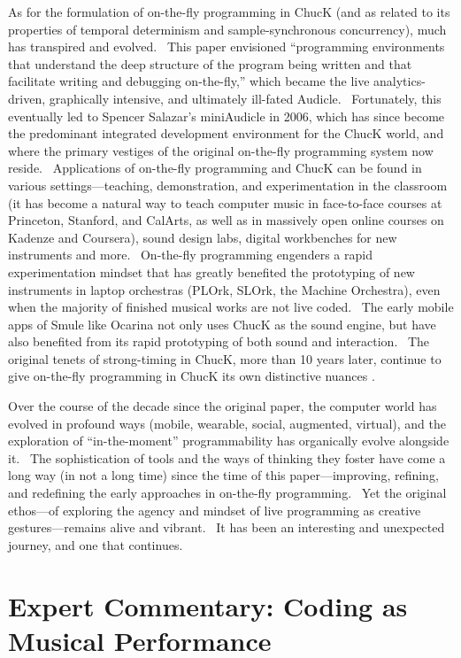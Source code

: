 As for the formulation of on-the-fly programming in ChucK (and as related to its properties of temporal determinism and sample-synchronous concurrency), much has transpired and evolved.  This paper envisioned ``programming environments that understand the deep structure of the program being written and that facilitate writing and debugging on-the-fly,'' which became the live analytics-driven, graphically intensive, and ultimately ill-fated Audicle.  Fortunately, this eventually led to Spencer Salazar's miniAudicle in 2006, which has since become the predominant integrated development environment for the ChucK world, and where the primary vestiges of the original on-the-fly programming system now reside.  Applications of on-the-fly programming and ChucK can be found in various settings---teaching, demonstration, and experimentation in the classroom (it has become a natural way to teach computer music in face-to-face courses at Princeton, Stanford, and CalArts, as well as in massively open online courses on Kadenze and Coursera), sound design labs, digital workbenches for new instruments and more.  On-the-fly programming engenders a rapid experimentation mindset that has greatly benefited the prototyping of new instruments in laptop orchestras (PLOrk, SLOrk, the Machine Orchestra), even when the majority of finished musical works are not live coded.  The early mobile apps of Smule like Ocarina \cite{Wang:2014} not only uses ChucK as the sound engine, but have also benefited from its rapid prototyping of both sound and interaction.  The original tenets of strong-timing in ChucK, more than 10 years later, continue to give on-the-fly programming in ChucK its own distinctive nuances \cite{Wang:2015}.

Over the course of the decade since the original paper, the computer world has evolved in profound ways (mobile, wearable, social, augmented, virtual), and the exploration of ``in-the-moment'' programmability has organically evolve alongside it.  The sophistication of tools and the ways of thinking they foster have come a long way (in not a long time) since the time of this paper---improving, refining, and redefining the early approaches in on-the-fly programming.  Yet the original ethos---of exploring the agency and mindset of live programming as creative gestures---remains alive and vibrant.  It has been an interesting and unexpected journey, and one that continues.



\section*{Expert Commentary: Coding as Musical Performance}

